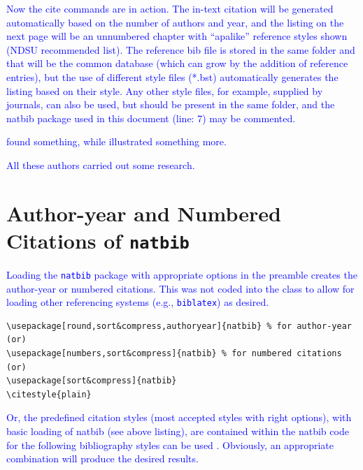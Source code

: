 \documentclass[phd]{ndsu-thesis-2022}
\newcommand\italk[1]{\textcolor{blue}{#1}}  %
\begin{document}
\italk{Now the cite commands are in action. The in-text citation will be generated automatically based on the number of authors and year, and the listing on the next page will be an unnumbered chapter with ``apalike'' reference styles shown (NDSU recommended list). The reference bib file is stored in the same folder and that will be the common database (which can grow by the addition of reference entries), but the use of different style files (*.bst) automatically generates the listing based on their style. Any other style files, for example, supplied by journals, can also be used, but should be present in the same folder, and the natbib package used in this document (line: 7) may be commented.}

\italk{\citet{calvo2004using} found something, while \citet{bari2016identification} illustrated something more. }

\italk{All these authors \citep{calvo2004using,cannayen2011latex,bari2016identification,sharma2012ndsu,baczkowski1990ndsu} carried out some research.} 

\section{Author-year and Numbered Citations of \texttt{natbib}}
\italk{Loading the \texttt{natbib} package with appropriate options in the preamble creates the author-year or numbered citations. This was not coded into the class to allow for loading other referencing systems (e.g., \texttt{biblatex}) as desired.}

{\singlespacing
\begin{verbatim}
\usepackage[round,sort&compress,authoryear]{natbib} % for author-year
(or)
\usepackage[numbers,sort&compress]{natbib} % for numbered citations
(or)
\usepackage[sort&compress]{natbib} 
\citestyle{plain}
\end{verbatim}
}

\italk{Or, the predefined citation styles (most accepted styles with right options), with basic loading of natbib (see above listing), are contained within the natbib code for the following bibliography styles can be used \citep{daly2010natural}. Obviously, an appropriate combination will produce the desired results.\\}
\end{document}
